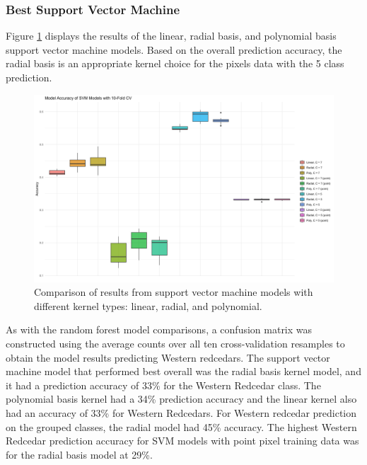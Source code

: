 \documentclass[12pt,twoside]{reedthesis}
\begin{document}
\hypertarget{best-support-vector-machine}{%
\subsubsection{Best Support Vector Machine}\label{best-support-vector-machine}}

Figure \ref{fig:svmresults} displays the results of the linear, radial basis, and polynomial basis support vector machine models. Based on the overall prediction accuracy, the radial basis is an appropriate kernel choice for the pixels data with the 5 class prediction.
\begin{figure}

{\centering \includegraphics[width=0.9\linewidth]{figure/svmresults} 

}

\caption{Comparison of results from support vector machine models with different kernel types: linear, radial, and polynomial.}\label{fig:svmresults}
\end{figure}
As with the random forest model comparisons, a confusion matrix was constructed using the average counts over all ten cross-validation resamples to obtain the model results predicting Western redcedars. The support vector machine model that performed best overall was the radial basis kernel model, and it had a prediction accuracy of 33\% for the Western Redcedar class. The polynomial basis kernel had a 34\% prediction accuracy and the linear kernel also had an accuracy of 33\% for Western Redcedars. For Western redcedar prediction on the grouped classes, the radial model had 45\% accuracy. The highest Western Redcedar prediction accuracy for SVM models with point pixel training data was for the radial basis model at 29\%.
\end{document}
